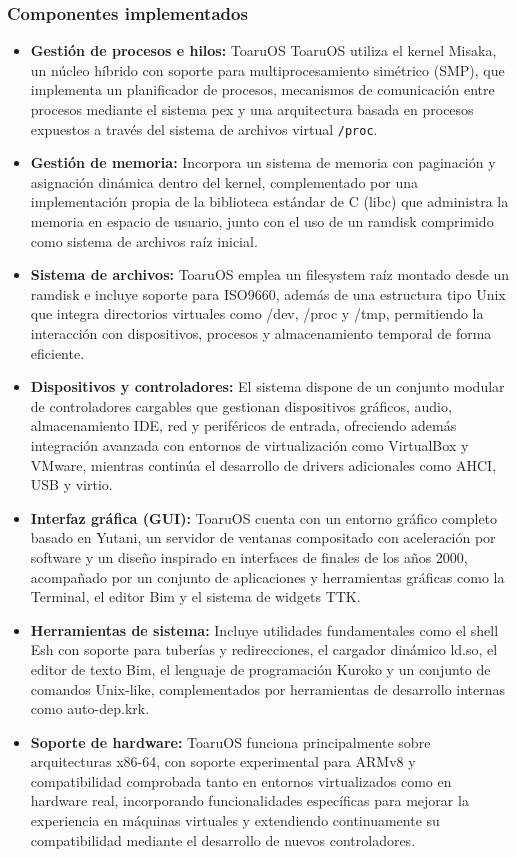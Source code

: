 \subsubsection{Componentes implementados}
\begin{itemize}
	\item \textbf{Gestión de procesos e hilos:} ToaruOS ToaruOS utiliza el kernel Misaka, un núcleo híbrido con soporte para multiprocesamiento simétrico (SMP), que implementa un planificador de procesos, mecanismos de comunicación entre procesos mediante el sistema pex y una arquitectura basada en procesos expuestos a través del sistema de archivos virtual \texttt{/proc}.

	\item \textbf{Gestión de memoria: } Incorpora un sistema de memoria  con paginación y asignación dinámica dentro del kernel, complementado por una implementación propia de la biblioteca estándar de C (libc) que administra la memoria en espacio de usuario, junto con el uso de un ramdisk comprimido como sistema de archivos raíz inicial.

	\item \textbf{Sistema de archivos:} ToaruOS emplea un filesystem raíz montado desde un ramdisk e incluye soporte para ISO9660, además de una estructura tipo Unix que integra directorios virtuales como /dev, /proc y /tmp, permitiendo la interacción con dispositivos, procesos y almacenamiento temporal de forma eficiente.

	\item \textbf{Dispositivos y controladores:} El sistema dispone de un conjunto modular de controladores cargables que gestionan dispositivos gráficos, audio, almacenamiento IDE, red y periféricos de entrada, ofreciendo además integración avanzada con entornos de virtualización como VirtualBox y VMware, mientras continúa el desarrollo de drivers adicionales como AHCI, USB y virtio.

	\item \textbf{Interfaz gráfica (GUI):}  ToaruOS cuenta con un entorno gráfico completo basado en Yutani, un servidor de ventanas compositado con aceleración por software y un diseño inspirado en interfaces de finales de los años 2000, acompañado por un conjunto de aplicaciones y herramientas gráficas como la Terminal, el editor Bim y el sistema de widgets TTK.

	\item \textbf{Herramientas de sistema:} Incluye utilidades fundamentales como el shell Esh con soporte para tuberías y redirecciones, el cargador dinámico ld.so, el editor de texto Bim, el lenguaje de programación Kuroko y un conjunto de comandos Unix-like, complementados por herramientas de desarrollo internas como auto-dep.krk.

	\item \textbf{Soporte de hardware:} ToaruOS funciona principalmente sobre arquitecturas x86-64, con soporte experimental para ARMv8 y compatibilidad comprobada tanto en entornos virtualizados como en hardware real, incorporando funcionalidades específicas para mejorar la experiencia en máquinas virtuales y extendiendo continuamente su compatibilidad mediante el desarrollo de nuevos controladores.
\end{itemize}

